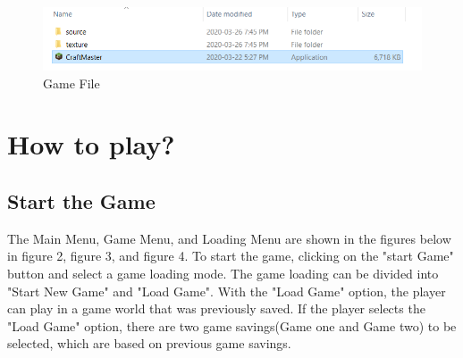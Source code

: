 \documentclass[12pt, titlepage]{article}
\begin{document}
\FloatBarrier

\begin{figure}[h]
\centering
\includegraphics[scale=0.7]{file}
\caption{Game File}
\end{figure}
\FloatBarrier

\section{How to play?}

\subsection{Start the Game}
The Main Menu, Game Menu, and Loading Menu are shown in the figures below in figure 2, figure 3, and figure 4. To start the game, clicking on the "start Game" button and select a game loading mode. The game loading can be divided into "Start New Game" and "Load Game". With the "Load Game" option, the player can play in a game world that was previously saved. If the player selects the "Load Game" option, there are two game savings(Game one and Game two) to be selected, which are based on previous game savings.
\FloatBarrier
\end{document}
